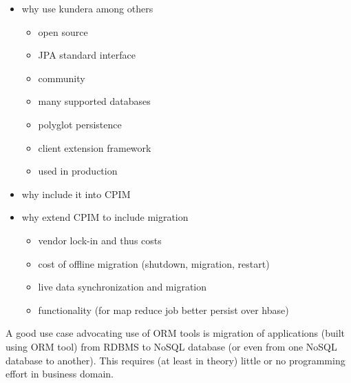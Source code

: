 \begin{itemize}
\item why use kundera among others
\begin{itemize}	
\item open source
\item JPA standard interface
\item community
\item many supported databases
\item polyglot persistence
\item client extension framework
\item used in production
\end{itemize}
\item why include it into CPIM
\item why extend CPIM to include migration
\begin{itemize}	
\item vendor lock-in and thus costs
\item cost of offline migration (shutdown, migration, restart)
\item live data synchronization and migration
\item functionality (for map reduce job better persist over hbase)
\end{itemize}
\end{itemize}

A good use case advocating use of ORM tools is migration of applications (built using ORM tool) from RDBMS to NoSQL database (or even from one NoSQL database to another). This requires (at least in theory) little or no programming effort in business domain.